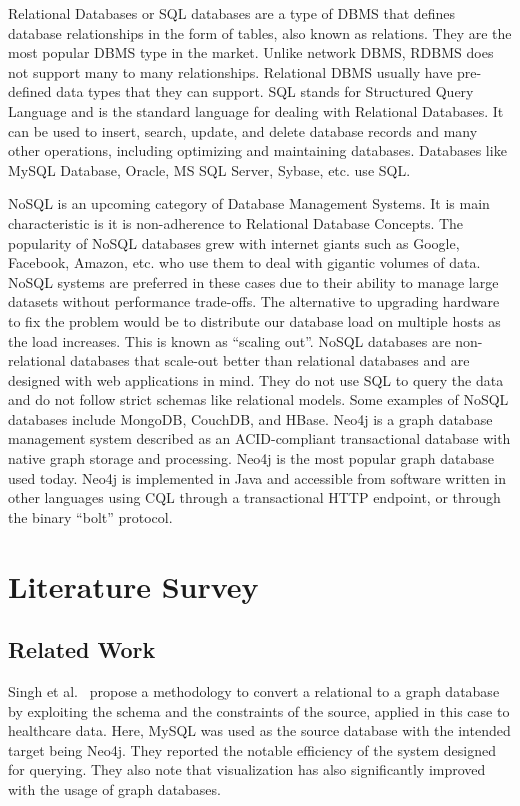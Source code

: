 \documentclass[12pt]{article}
\newcommand{\sectionfontstyle}{\fontsize{16pt}{1em}\usefont{T1}{phv}{b}{n}}
\begin{document}
    Relational Databases or SQL databases are a  type of DBMS that defines database relationships in the form of tables, also known as relations. They are the most popular DBMS type in the market. Unlike network DBMS, RDBMS does not support many to many relationships. Relational DBMS usually have pre-defined data types that they can support. SQL stands for Structured Query Language and is the standard language for dealing with Relational Databases. It can be used to insert, search, update, and delete database records and many other operations, including optimizing and maintaining databases. Databases like MySQL Database, Oracle, MS SQL Server, Sybase, etc. use SQL.

    NoSQL is an upcoming category of Database Management Systems. It is main characteristic is it is non-adherence to Relational Database Concepts. The popularity of NoSQL databases grew with internet giants such as Google, Facebook, Amazon, etc. who use them to deal with gigantic volumes of data. NoSQL systems are preferred in these cases due to their ability to manage large datasets without performance trade-offs. The alternative to upgrading hardware to fix the problem would be to distribute our database load on multiple hosts as the load increases. This is known as ``scaling out''. NoSQL databases are non-relational databases that scale-out better than relational databases and are designed with web applications in mind. They do not use SQL to query the data and do not follow strict schemas like relational models. Some examples of NoSQL databases include MongoDB, CouchDB, and HBase.
    Neo4j is a graph database management system described as an ACID-compliant transactional database with native graph storage and processing. Neo4j is the most popular graph database used today. Neo4j is implemented in Java and accessible from software written in other languages using CQL through a transactional HTTP endpoint, or through the binary ``bolt'' protocol.

    \newpage

    \section{\sectionfontstyle Literature Survey}
    \subsection{Related Work}
    Singh et al.~\cite{base_paper} propose a methodology to convert a relational to a graph database by exploiting the schema and the constraints of the source, applied in this case to healthcare data. Here, MySQL was used as the source database with the intended target being Neo4j. They reported the notable efficiency of the system designed for querying. They also note that visualization has also significantly improved with the usage of graph databases.
\end{document}
